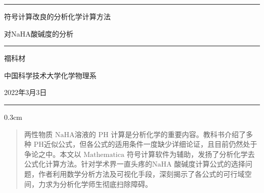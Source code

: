 \documentclass[UTF-8]{ctexart}
\newcommand{\0}{\boldsymbol{0}}
\newcommand{\setparDis}{\setlength{\parskip} {0.3cm} }
\begin{document}
\begin{titlepage}
    \centering


    \rule{\textwidth}{1pt}   %
    \vspace{0.2\textheight}  %


    {\Huge \kaishu  符号计算改良的分析化学计算方法}

    \vspace{0.01\textheight}

    {\huge \kaishu 对NaHA酸碱度的分析}

    \vspace{0.025\textheight}   %

    \rule{0.83\textwidth}{0.4pt}  %

    \vspace{0.1\textheight}  %


    {\Large \textsc{\kaishu 禤科材}}

    \vspace{0.015\textheight}

    {\Large \textsc{\kaishu 中国科学技术大学\;化学物理系}}

    \vfill  %

    {\large \kaishu 2022年3月3日}
    \vspace{0.1\textheight}  %


    \rule{\textwidth}{1pt}  %

  \end{titlepage}
\setparDis
\nocite{*}
\begin{abstract}
    \kaishu \fontsize{10pt}{16pt}
        两性物质 $\text{NaHA} $溶液的  $\text{PH}$  计算是分析化学的重要内容。教科书介绍了多种 $\text{PH} $近似公式，但各公式的适用条件一度缺少详细论证，且目前仍然处于争论之中。本文以 $\text{Mathematica}$ 符号计算软件为辅助，发扬了分析化学去公式化计算方法。针对学术界一直头疼的$ \text{NaHA}$ 酸碱度计算公式的选择问题，作者利用数学分析方法及可视化手段，深刻揭示了各公式的可行域空间，力求为分析化学师生彻底扫除障碍。
    \end{abstract}
\tableofcontents
\end{document}

